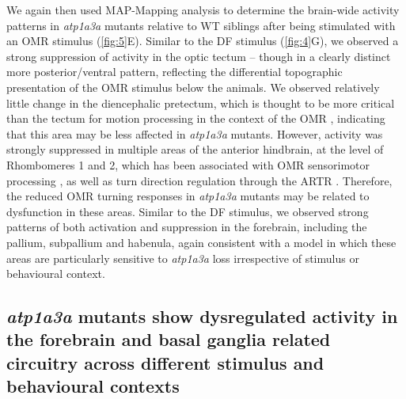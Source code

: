 \documentclass[9.5pt,lineno]{RandlettLab_elife}
\begin{document}
We again then used MAP-Mapping analysis to determine the brain-wide activity patterns in \emph{atp1a3a} mutants relative to WT siblings after being stimulated with an OMR stimulus (\autoref{fig:5}E).
Similar to the DF stimulus (\autoref{fig:4}G), we observed a strong suppression of activity in the optic tectum -- though in a clearly distinct more posterior/ventral pattern, reflecting the differential topographic presentation of the OMR stimulus below the animals. 
We observed relatively little change in the diencephalic pretectum, which is thought to be more critical than the tectum for motion processing in the context of the OMR \citep{Matsuda2021-a, Wang2020-a}, indicating that this area may be less affected in \emph{atp1a3a} mutants.
However, activity was strongly suppressed in multiple areas of the anterior hindbrain, at the level of Rhombomeres 1 and 2, which has been associated with OMR sensorimotor processing \citep{Chen2018-sdf}, as well as turn direction regulation through the ARTR \citep{Dunn2016-asd}.
Therefore, the reduced OMR turning responses in \emph{atp1a3a} mutants may be related to dysfunction in these areas. 
Similar to the DF stimulus, we observed strong patterns of both activation and suppression in the forebrain, including the pallium, subpallium and habenula, again consistent with a model in which these areas are particularly sensitive to \emph{atp1a3a} loss irrespective of stimulus or behavioural context.  


\subsection{\emph{atp1a3a} mutants show dysregulated activity in the forebrain and basal ganglia related circuitry across different stimulus and behavioural contexts}
\end{document}
